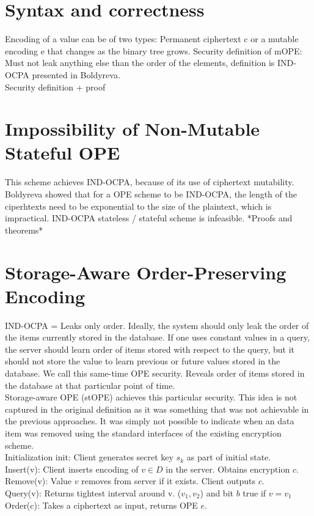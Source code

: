 \documentclass[10pt]{article}
\begin{document}
\section{Syntax and correctness}

Encoding of a value can be of two types: Permanent ciphertext c or a mutable encoding e that changes as the binary tree grows. Security definition of mOPE: Must not leak anything else than the order of the elements, definition is IND-OCPA presented in Boldyreva. \\

Security definition + proof\\


\section{Impossibility of Non-Mutable Stateful OPE}


This scheme achieves IND-OCPA, because of its use of ciphertext mutability. Boldyreva showed that for a OPE scheme to be IND-OCPA, the length of the ciperhtexts need to be exponential to the size of the plaintext, which is impractical. IND-OCPA stateless / stateful scheme is infeasible. *Proofs and theorems*


\section{Storage-Aware Order-Preserving Encoding}

IND-OCPA = Leaks only order. Ideally, the system should only leak the order of the items currently stored in the database. If one uses constant values in a query, the server should learn order of items stored with respect to the query, but it should not store the value to learn previous or future values stored in the database. We call this same-time OPE security. Reveals order of items stored in the database at that particular point of time.\\

Storage-aware OPE (stOPE) achieves this particular security. This idea is not captured in the original definition as it was something that was not achievable in the previous approaches. It was simply not possible to indicate when an data item was removed using the standard interfaces of the existing encryption scheme.\\

Initialization init: Client generates secret key $s_k$ as part of initial state.\\
Insert(v): Client inserts encoding of $v \in D$ in the server. Obtains encryption $c$.\\
Remove(v): Value $v$ removes from server if it exists. Client outputs $c$.\\
Query(v): Returns tightest interval around v. ($v_1, v_2$) and bit $b$ true if $v=v_1$\\
Order(c): Takes a ciphertext as input, returns OPE $e$.\\
\end{document}
